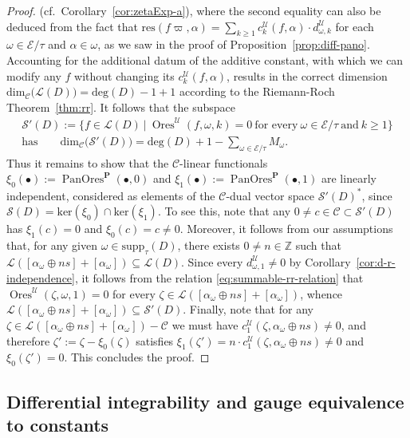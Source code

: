 \documentclass[preprint,12pt]{elsarticle}
\numberwithin{equation}{section} %
\theoremstyle{theorem}
\theoremstyle{definition}
\newcommand{\Ca}{\mathcal{C}} %
\newcommand{\ec}{\mathcal{E}} %
\newcommand{\orbita}{{\ec/\tau}} %
\newcommand{\Z}{\mathbb{Z}} %
\DeclareMathOperator{\ores}{Ores}
\DeclareMathOperator{\pano}{PanOres}
\begin{document}
\begin{proof}
(cf.~Corollary~\ref{cor:zetaExp-a}), where the second equality can also be deduced from the fact that $\mathrm{res}(f\varpi,\alpha)=\sum_{k\geq 1}c^\mathcal{U}_{k}(f,\alpha)\cdot d^\mathcal{U}_{\omega,k}$ for each $\omega\in\orbita$ and $\alpha\in\omega$, as we saw in the proof of Proposition~\ref{prop:diff-pano}. Accounting for the additional datum of the additive constant, with which we can modify any $f$ without changing its $c^\mathcal{U}_k(f,\alpha)$, results in the correct dimension $\mathrm{dim}_\mathcal{C}\bigl(\mathcal{L}(D)\bigr)=\mathrm{deg}(D)-1+1$ according to the Riemann-Roch Theorem~\ref{thm:rr}. It follows that the subspace \begin{gather*}\mathcal{S}'(D):=\bigl\{f\in\mathcal{L}(D) \ \big| \ \ores^\mathcal{U}(f,\omega,k)=0 \ \text{for every} \ \omega\in\orbita \ \text{and} \ k\geq 1\bigr\}\\ \text{has} \qquad\mathrm{dim}_\Ca\bigl(\mathcal{S}'(D)\bigr)=\mathrm{deg}(D)+1-\sum_{\omega\in\orbita}M_\omega.\end{gather*} Thus it remains to show that the $\Ca$-linear functionals $\xi_0(\bullet):=\pano^\mathbf{P}(\bullet,0)$ and $\xi_1(\bullet):=\pano^\mathbf{P}(\bullet,1)$ are linearly independent, considered as elements of the $\Ca$-dual vector space $\mathcal{S}'(D)^*$, since $\mathcal{S}(D)=\mathrm{ker}(\xi_0)\cap\mathrm{ker}(\xi_1)$. To see this, note that any $0\neq c\in\Ca\subset\mathcal{S}'(D)$ has $\xi_1(c)=0$ and $\xi_0(c)=c\neq 0$. Moreover, it follows from our assumptions that, for any given $\omega\in\mathrm{supp}_\tau(D)$, there exists $0\neq n\in\Z$ such that $\mathcal{L}([\alpha_\omega\oplus ns]+[\alpha_\omega])\subseteq \mathcal{L}(D)$. Since every $d^\mathcal{U}_{\omega,1}\neq 0$ by Corollary~\ref{cor:d-r-independence}, it follows from the relation \eqref{eq:summable-rr-relation} that $\ores^\mathcal{U}(\zeta,\omega,1)=0$ for every $\zeta\in\mathcal{L}([\alpha_\omega\oplus ns]+[\alpha_\omega])$, whence $\mathcal{L}([\alpha_\omega\oplus ns]+[\alpha_\omega])\subseteq\mathcal{S}'(D)$. Finally, note that for any $\zeta\in\mathcal{L}([\alpha_\omega\oplus ns]+[\alpha_\omega])-\Ca$ we must have $c^\mathcal{U}_1(\zeta,\alpha_\omega\oplus ns)\neq 0$, and therefore $\zeta':=\zeta-\xi_0(\zeta)$ satisfies $\xi_1(\zeta')=n\cdot c^\mathcal{U}_1(\zeta,\alpha_\omega\oplus ns)\neq 0$ and $\xi_0(\zeta')=0$. This concludes the proof.
\end{proof}

\subsection{Differential integrability and gauge equivalence to constants} \label{sec:integrability}
\end{document}
